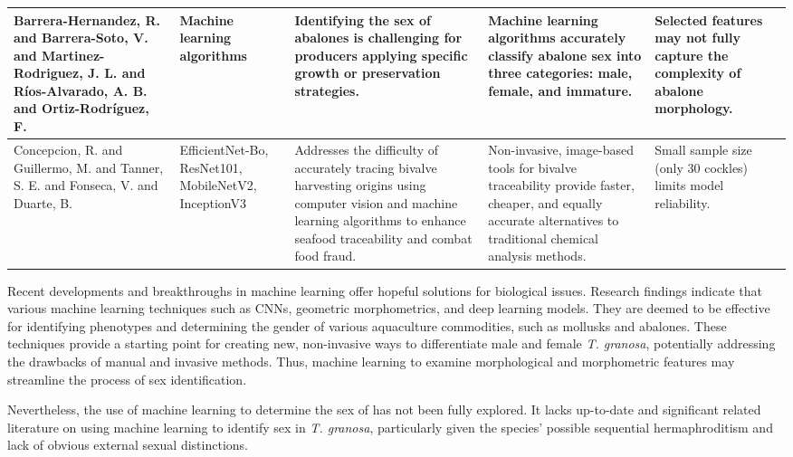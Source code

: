 \begin{table}[]
\begin{adjustbox}{scale=0.55,center}
\begin{tabular}{|p{5cm}|p{5cm}|p{8cm}|p{8cm}|p{8cm}|}
		Barrera-Hernandez, R. and Barrera-Soto, V. and Martinez-Rodriguez, J. L. and Ríos-Alvarado, A. B. and Ortiz-Rodríguez, F. &
		Machine learning algorithms &
		Identifying the sex of abalones is challenging for producers applying specific growth or preservation strategies. &
		Machine learning algorithms accurately classify abalone sex into three categories: male, female, and immature. &
		Selected features may not fully capture the complexity of abalone morphology. \\ \hline
		
		Concepcion, R. and Guillermo, M. and Tanner, S. E. and Fonseca, V. and Duarte, B. &
		EfficientNet-Bo, ResNet101, MobileNetV2, InceptionV3 &
		Addresses the difficulty of accurately tracing bivalve harvesting origins using computer vision and machine learning algorithms to enhance seafood traceability and combat food fraud. &
		Non-invasive, image-based tools for bivalve traceability provide faster, cheaper, and equally accurate alternatives to traditional chemical analysis methods. &
		Small sample size (only 30 cockles) limits model reliability. \\ \hline
		
	\end{tabular}
	\end{adjustbox}
\end{table}

\newpage

Recent developments and breakthroughs in machine learning offer hopeful solutions for biological issues. Research findings indicate that various machine learning techniques such as CNNs, geometric morphometrics, and deep learning models. They are deemed to be effective for identifying phenotypes and determining the gender of various aquaculture commodities, such as mollusks and abalones. These techniques provide a starting point for creating new, non-invasive ways to differentiate male and female \textit{T. granosa}, potentially addressing the drawbacks of manual and invasive methods. Thus,  machine learning to examine morphological and morphometric features may streamline the process of sex identification.

Nevertheless, the use of machine learning to determine the sex of \Tgranosa has not been fully explored. It lacks up-to-date and significant related literature on using machine learning to identify sex in \textit{T. granosa}, particularly given the species’ possible sequential hermaphroditism and lack of obvious external sexual distinctions.










